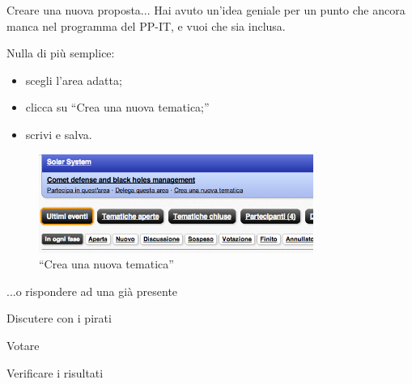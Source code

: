 \documentclass{beamer}
\begin{document}
\begin{frame}{Creare una nuova proposta... }
Hai avuto un'idea geniale per un punto che ancora manca nel programma del PP-IT, e vuoi che sia inclusa.

Nulla di pi\`u semplice: \begin{itemize}\item scegli l'area adatta;\item clicca su ``Crea una nuova tematica;''\item scrivi e salva.\end{itemize}
\begin{figure}\includegraphics[width=0.8\textwidth]{pics/partecipa}
\caption{``Crea una nuova tematica''}
\end{figure}

\end{frame}

\begin{frame}{...o rispondere ad una gi\`a presente}
\end{frame}

\begin{frame}{Discutere con i pirati}
\end{frame}

\begin{frame}{Votare}
\end{frame}

\begin{frame}{Verificare i risultati}
\end{frame}
\end{document}
